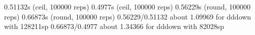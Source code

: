 0.51132s (ceil, 100000 reps)                            0.4977s (ceil, 100000 reps)                            
0.56229s (round, 100000 reps)                           0.66873s (round, 100000 reps)                          
0.56229/0.51132 about 1.09969 for dddown with 128211sp  0.66873/0.4977 about 1.34366 for dddown with 82028sp   











































































































































